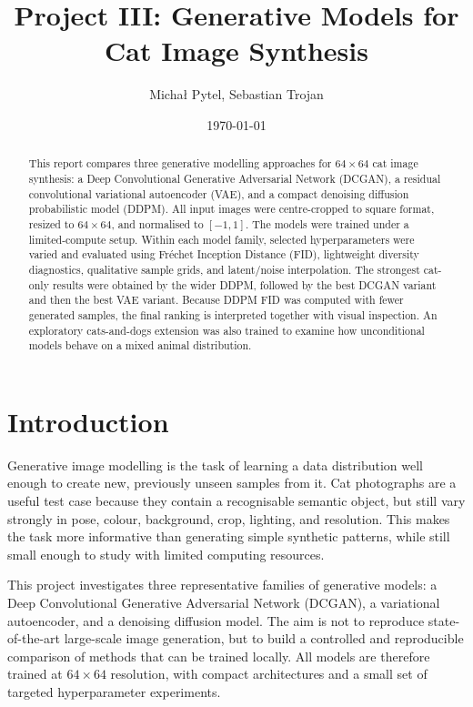 \documentclass[11pt,a4paper]{article}
\title{Project III: Generative Models for Cat Image Synthesis}
\author{Michał Pytel, Sebastian Trojan}
\date{\today}
\begin{document}
\maketitle

\begin{abstract}
This report compares three generative modelling approaches for $64\times64$ cat image synthesis:
a Deep Convolutional Generative Adversarial Network (DCGAN), a residual convolutional variational autoencoder (VAE), and a compact denoising diffusion probabilistic model (DDPM).
All input images were centre-cropped to square format, resized to $64\times64$, and normalised to $[-1,1]$. The models were trained under a limited-compute setup.
Within each model family, selected hyperparameters were varied and evaluated using Fr\'echet Inception Distance (FID), lightweight diversity diagnostics, qualitative sample grids, and latent/noise interpolation.
The strongest cat-only results were obtained by the wider DDPM, followed by the best DCGAN variant and then the best VAE variant. Because DDPM FID was computed with fewer generated samples, the final ranking is interpreted together with visual inspection.
An exploratory cats-and-dogs extension was also trained to examine how unconditional models behave on a mixed animal distribution.
\end{abstract}

\clearpage
\tableofcontents
\clearpage

\section{Introduction}

Generative image modelling is the task of learning a data distribution well enough to create new, previously unseen samples from it.
Cat photographs are a useful test case because they contain a recognisable semantic object, but still vary strongly in pose, colour, background, crop, lighting, and resolution.
This makes the task more informative than generating simple synthetic patterns, while still small enough to study with limited computing resources.

This project investigates three representative families of generative models: a Deep Convolutional Generative Adversarial Network (DCGAN), a variational autoencoder, and a denoising diffusion model.
The aim is not to reproduce state-of-the-art large-scale image generation, but to build a controlled and reproducible comparison of methods that can be trained locally.
All models are therefore trained at $64\times64$ resolution, with compact architectures and a small set of targeted hyperparameter experiments.
\end{document}
